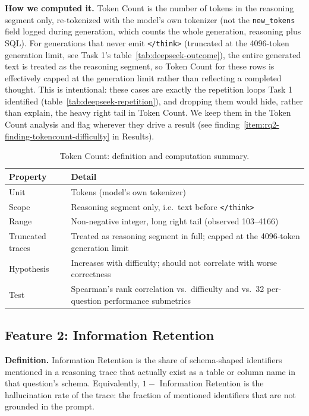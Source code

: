 \textbf{How we computed it.} Token Count is the number of tokens in the reasoning segment only, re-tokenized with the model's own tokenizer (not the \texttt{new\_tokens} field logged during generation, which counts the whole generation, reasoning plus SQL). For generations that never emit \texttt{</think>} (truncated at the 4096-token generation limit, see Task 1's table~\ref{tab:deepseek-outcome}), the entire generated text is treated as the reasoning segment, so Token Count for these rows is effectively capped at the generation limit rather than reflecting a completed thought. This is intentional: these cases are exactly the repetition loops Task 1 identified (table~\ref{tab:deepseek-repetition}), and dropping them would hide, rather than explain, the heavy right tail in Token Count. We keep them in the Token Count analysis and flag wherever they drive a result (see finding~\ref{item:rq2-finding-tokencount-difficulty} in Results).

\begin{table}[H]
\centering
\footnotesize
\caption{Token Count: definition and computation summary.}
\label{tab:rq2-feature-tokencount-summary}
\begin{tabular}{p{}p{}}
\toprule
Property & Detail \\
\midrule
Unit & Tokens (model's own tokenizer) \\
Scope & Reasoning segment only, i.e.\ text before \texttt{</think>} \\
Range & Non-negative integer, long right tail (observed 103--4166) \\
Truncated traces & Treated as reasoning segment in full; capped at the 4096-token generation limit \\
Hypothesis & Increases with difficulty; should not correlate with worse correctness \\
Test & Spearman's rank correlation vs.\ difficulty and vs.\ 32 per-question performance submetrics \\
\bottomrule
\end{tabular}
\end{table}

\subsection{Feature 2: Information Retention}
\label{sec:rq2-feature-retention}

\textbf{Definition.} Information Retention is the share of schema-shaped identifiers mentioned in a reasoning trace that actually exist as a table or column name in that question's schema. Equivalently, $1 - $ Information Retention is the hallucination rate of the trace: the fraction of mentioned identifiers that are not grounded in the prompt.

